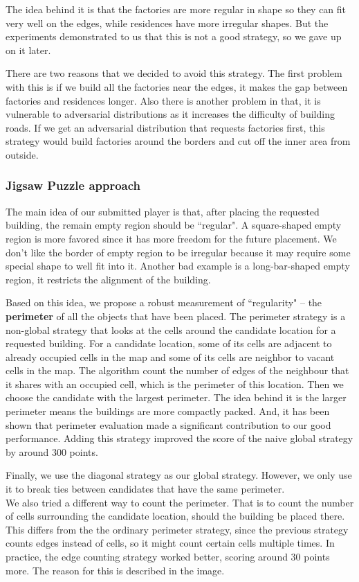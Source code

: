 The idea behind it is that the factories are more regular in shape so they can fit very well on the edges, while residences have more irregular shapes. But the experiments demonstrated to us that this is not a good strategy, so we gave up on it later. 

There are two reasons that we decided to avoid this strategy. The first problem with this is if we build all the factories near the edges, it makes the gap between factories and residences longer. Also there is another problem in that, it is vulnerable to adversarial distributions as it increases the difficulty of building roads. If we get an adversarial distribution that requests factories first, this strategy would build factories around the borders and cut off the inner area from outside. 

\subsubsection{Jigsaw Puzzle approach}
The main idea of our submitted player is that, after placing the requested building, the remain empty region should be ``regular". A square-shaped empty region is more favored since it has more freedom for the future placement. We don't like the border of empty region to be irregular because it may require some special shape to well fit into it. Another bad example is a long-bar-shaped empty region, it restricts the alignment of the building.

Based on this idea, we propose a robust measurement of ``regularity" -- the {\bf perimeter} of all the objects that have been placed.
The perimeter strategy is a non-global strategy that looks at the cells around the candidate location for a requested building. For a candidate location, some of its cells are adjacent to already occupied cells in the map and some of its cells are neighbor to vacant cells in the map. The algorithm count the number of edges of the neighbour that it shares with an occupied cell, which is the perimeter of this location. Then we choose the candidate with the largest perimeter. The idea behind it is the larger perimeter means the buildings are more compactly packed. And, it has been shown that perimeter evaluation made a significant contribution to our good performance. Adding this strategy improved the score of the naive global strategy by around 300 points. 

Finally, we use the diagonal strategy as our global strategy. However, we only use it to break ties between candidates that have the same perimeter.\\
We also tried a different way to count the perimeter. That is to count the number of cells surrounding the candidate location, should the building be placed there. This differs from the the ordinary perimeter strategy, since the previous strategy counts edges instead of cells, so it might count certain cells multiple times. In practice, the edge counting strategy worked better, scoring around 30 points more. The reason for this is described in the image.

